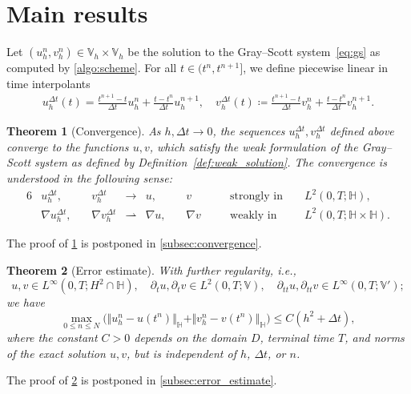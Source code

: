 \documentclass[11pt, a4paper]{amsart}
\newcommand{\HH}{\mathbb{H}}
\newcommand{\VV}{\mathbb{V}}
\newtheorem{theorem}{Theorem}[section]
\numberwithin{equation}{section}
\begin{document}
	\section{Main results}\label{sec:main_results}
	Let $ (u_h^n, v_h^n )\in \VV_h\times \VV_h $ be the solution to the Gray--Scott system~\eqref{eq:gs} as computed by \cref{algo:scheme}.
	For all $t\in (t^{n},t^{n+1}]$, we define piecewise linear in time interpolants
	\begin{align*}
		u_h^{\Delta t}(t) = \frac{t^{n+1} - t}{\Delta t} u_h^n + \frac{t - t^{n}}{\Delta t} u_h^{n+1},
		\quad
		v_h^{\Delta t}(t)\coloneqq \frac{t^{n+1} - t}{\Delta t} v_h^n + \frac{t - t^{n}}{\Delta t} v_h^{n+1}.
	\end{align*}
	
	\begin{theorem}[Convergence]\label{thm:convergence}
		As $h,\Delta t\to 0$, the sequences $u_h^{\Delta t}, v_h^{\Delta t}$ defined above converge to the functions $u,v$, which satisfy the weak formulation of the Gray--Scott system as defined by Definition~\ref{def:weak_solution}. The convergence
		is understood in the following sense:
		\begin{alignat*}{6}
			&u_h^{\Delta t}, &\, &v_h^{\Delta t}&\to{}& u, &\, &v &&\quad\mbox{strongly in } &&L^2(0,T;\HH),
			\\
			&\nabla u_h^{\Delta t} ,&\, &\nabla v_h^{\Delta t} &{}\rightharpoonup{}& \nabla u ,&\, &\nabla v &&\quad\mbox{weakly in } &&L^2(0,T;\HH\times \HH).
		\end{alignat*}
	\end{theorem}
	The proof of \cref{thm:convergence} is postponed in \cref{subsec:convergence}.
	
	\begin{theorem}[Error estimate]\label{thm:error_estimate}
		With further regularity, i.e.,
		\[
		u, v \in L^\infty(0,T; H^2\cap\HH),\quad \partial_t u, \partial_t v \in L^2(0,T; \VV),\quad \partial_{tt} u, \partial_{tt} v \in L^\infty(0,T; \VV');
		\]
		we have
		\begin{equation*}
			\max_{0\leq n\leq N} \Big(\Vert u_h^n - u(t^n) \Vert_{\HH} + \Vert v_h^n - v(t^n) \Vert_{\HH}\Big)\leq C(h^2 + \Delta t),
		\end{equation*}
		where the constant $C>0$ depends on the domain $D$, terminal time $T$, and norms of the exact solution $u, v$, but is independent of $h$, $\Delta t$, or $n$.
	\end{theorem}
	The proof of \cref{thm:error_estimate} is postponed in \cref{subsec:error_estimate}.
	
\end{document}
